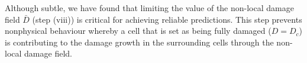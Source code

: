 \documentclass[sn-mathphys,Numbered,draft]{sn-jnl}%
\begin{document}
Although subtle, we have found that limiting the value of the non-local damage field $\bar{D}$ (step (viii)) is critical for achieving reliable predictions.
This step prevents nonphysical behaviour whereby a cell that is set as being fully damaged ($D = D_c$) is contributing to the damage growth in the surrounding cells through the non-local damage field.

%
%
%
\end{document}
